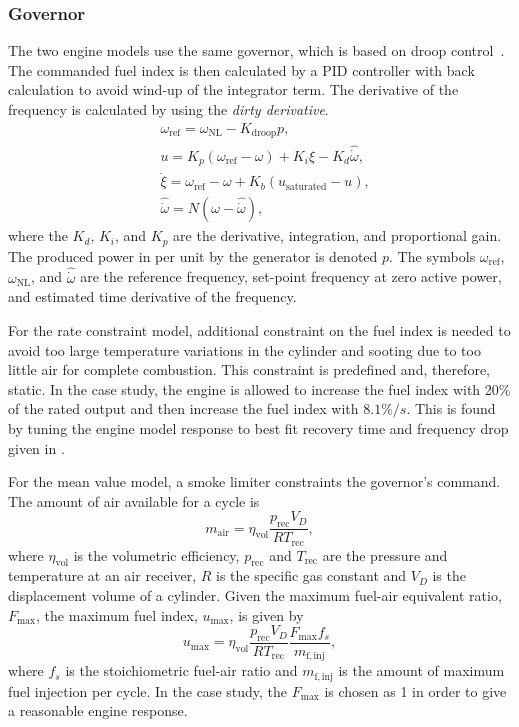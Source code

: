 \documentclass[journal]{IEEEtran}
\begin{document}
\subsubsection{Governor}
The two engine models use the same governor, which is based on droop control~\cite{Woodward2004}.
The commanded fuel index is then calculated by a PID controller with back calculation to avoid wind-up of the integrator term.
The derivative of the frequency is calculated by using the \textit{dirty derivative}.
\begin{align}
&\omega_\mathrm{ref} = \omega_\mathrm{NL}-K_\mathrm{droop}p, \\
&u = K_p (\omega_\mathrm{ref}-\omega)+K_i \xi - K_d \hat{\dot{\omega}},\\
&\dot{\xi} = \omega_\mathrm{ref}-\omega + K_b(u_\mathrm{saturated}-u),\\
&\hat{\dot{\omega}}= N(\omega-\hat{\dot{\omega}}),
\end{align}
where the $K_d$, $K_i$, and $K_p$ are the derivative, integration, and proportional gain. The produced power in per unit by the generator is denoted $p$. The symbols $\omega_\mathrm{ref}$, $\omega_\mathrm{NL}$, and $\hat{\dot{\omega}}$ are the reference frequency, set-point frequency at zero active power, and estimated time derivative of the frequency.

For the rate constraint model, additional constraint on the fuel index is needed to avoid too large temperature variations in the cylinder and sooting due to too little air for complete combustion. This constraint is predefined and, therefore, static. In the case study, the engine is allowed to increase the fuel index with 20\% of the rated output and then increase the fuel index with $8.1 \%/s$. This is found by tuning the engine model response to best fit recovery time and frequency drop given in \cite{MANEnginesandSystems2013}.

For the mean value model, a smoke limiter constraints the governor's command. 
The amount of air available for a cycle is
\begin{equation}
\label{eq:airAvail}
m_\mathrm{air} = \eta_\mathrm{vol}\frac{p_\mathrm{rec}V_{D}}{RT_\mathrm{rec}} ,
\end{equation}
where $\eta_\mathrm{vol}$ is the volumetric efficiency, $p_\mathrm{rec}$ and $T_\mathrm{rec}$ are the pressure and temperature at an air receiver, $R$ is the specific gas constant and $V_D$ is the displacement volume of a cylinder.
Given the maximum fuel-air equivalent ratio, $F_\mathrm{max}$, the maximum fuel index, $u_\mathrm{max}$, is given by
\begin{equation}
\label{eq:maxFIndex}
u_\mathrm{max} = \eta_\mathrm{vol}\frac{p_\mathrm{rec}V_{D}}{RT_\mathrm{rec}} \frac{F_\mathrm{max}f_s}{m_\mathrm{f,inj}},
\end{equation}
where $f_s$ is the stoichiometric fuel-air ratio and $m_\mathrm{f,inj}$ is the amount of maximum fuel injection per cycle. In the case study, the $F_\mathrm{max}$ is chosen as 1 in order to give a reasonable engine response.
\end{document}
